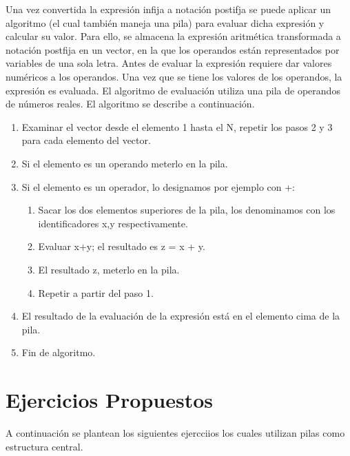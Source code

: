 Una vez convertida la expresión infija a notación postifja se puede aplicar un algoritmo (el cual también maneja una pila) para evaluar dicha expresión y calcular su valor.  Para ello, se almacena la expresión aritmética transformada a notación postfija en un vector, en la que los operandos están representados por variables de una sola letra. Antes de evaluar la expresión requiere dar valores numéricos a los operandos. Una vez que se tiene los valores de los operandos, la expresión es evaluada. El algoritmo de evaluación utiliza una pila de operandos de números reales. El algoritmo se describe a continuación.
\begin{enumerate}
	\item Examinar el vector desde el elemento 1 hasta el N, repetir los pasos 2 y 3 para cada elemento del vector.
	\item Si el elemento es un operando meterlo en la pila.
	\item Si el elemento es un operador, lo designamos por ejemplo con +:
	\begin{enumerate}
		\item Sacar los dos elementos superiores de la pila, los denominamos con los identificadores x,y respectivamente.
		\item Evaluar x+y; el resultado es z = x + y.
		\item El resultado z, meterlo en la pila.
		\item Repetir a partir del paso 1.
	\end{enumerate}
	\item El resultado de la evaluación de la expresión está en el elemento cima de la       pila.
	\item Fin de algoritmo.
\end{enumerate}


\section{Ejercicios Propuestos}
A continuación se plantean los siguientes ejercciios los cuales utilizan pilas como estructura central.

